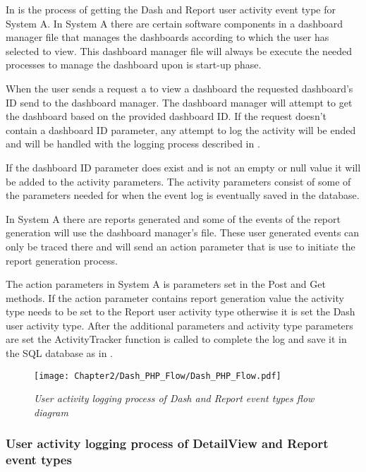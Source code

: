 In  is the process of getting the Dash and Report user activity event type for System A. In System A there are certain software components in a dashboard manager file that manages the dashboards according to which the user has selected to view. This dashboard manager file will always be execute the needed processes to manage the dashboard upon is start-up phase.\par When the user sends a request a to view a dashboard the requested dashboard's ID send to the dashboard manager. The dashboard manager will attempt to get the dashboard based on the provided dashboard ID. If the request doesn't contain a dashboard ID parameter, any attempt to log the activity will be ended and will be handled with the logging process described in . \par If the dashboard ID parameter does exist and is not an empty or null value it will be added to the activity parameters. The activity parameters consist of some of the parameters needed for  when the event log is eventually saved in the database. \par In System A there are reports generated and some of the events of the report generation will use the dashboard manager's file. These user generated events can only be traced there and will send an action parameter that is use to initiate the report generation process.\par The action parameters in System A is parameters set in the Post and Get methods. If the action parameter contains report generation value the activity type needs to be set to the Report user activity type otherwise it is set the Dash user activity type. After the additional parameters and activity type parameters are set the ActivityTracker function is called to complete the log and save it in the SQL database as in . 

\begin{figure}[!htb] %
	\centering %
	\texttt{[image: Chapter2/Dash\_PHP\_Flow/Dash\_PHP\_Flow.pdf]}
	\caption[User activity logging of Dash and Report event types]
	{\textit{User activity logging process of Dash and Report event types flow diagram}}\label{fig:ch2_Dash_PHP_Flow}
\end{figure}

\clearpage

\subsubsection{User activity logging process of DetailView and Report event types}

